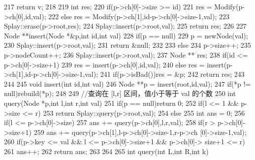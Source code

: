 \documentclass[11pt]{article}
\begin{document}
\begin{Code}
{{{217                  return v;
218              }
219              int res;
220              if(p->ch[0]->size >= id)
221                  res = Modify(p->ch[0],id,val);
222              else res = Modify(p->ch[1],id-p->ch[0]->size-1,val);
223              Splay::erase(p->root,res);
224              Splay::insert(p->root,val);
225              return res;
226       }
227       Node **insert(Node *&p,int id,int val){
228           if(p == null){
229               p = newNode(val);
230               Splay::insert(p->root,val);
231               return &null;
232           }
233           else {
234               p->size++;
235               p->nodeCount++;
236               Splay::insert(p->root,val);
237               Node ** res;
238               if(id <= p->ch[0]->size+1)
239                   res = insert(p->ch[0],id,val);
240               else res = insert(p->ch[1],id-p->ch[0]->size-1,val);
241               if(p->isBad())res = &p;
242               return res;
243           }
244       }
245       void insert(int id,int val){
246           Node **p = insert(root,id,val);
247           if(*p != null)rebuild(*p);
248       }
249       //查询在 [l,r] 区间，值小于等于 val 的个数
250       int query(Node *p,int l,int r,int val){
251           if(p == null)return 0;
252           if(l <= 1 && p->size <= r)
253               return Splay::query(p->root,val);
254           else {
255               int ans = 0;
256               if(l <= p->ch[0]->size)
257                   ans += query(p->ch[0],l,r,val);
258               if(r > p->ch[0]->size+1)
259                   ans += query(p->ch[1],l-p->ch[0]->size-1,r-p->ch
                         [0]->size-1,val);
260               if(p->key <= val && l <= p->ch[0]->size+1 && p->ch[0]->
                     size+1 <= r)
261                   ans++;
262               return ans;
263           }
264       }
265       int query(int L,int R,int k){


}}
\end{Code}
\end{document}
